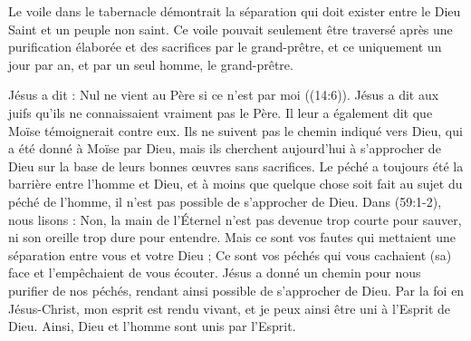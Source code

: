 Le voile dans le tabernacle démontrait la séparation qui doit exister entre le Dieu Saint et un peuple non saint. Ce voile pouvait seulement être traversé après une purification élaborée et des sacrifices par le grand-prêtre, et ce uniquement un jour par an, et par un seul homme, le grand-prêtre.

Jésus a dit : \og Nul ne vient au Père si ce n'est par moi \fg{} ((14:6)). Jésus a dit aux juifs qu'ils ne connaissaient vraiment pas le Père. Il leur a également dit que Moïse témoignerait contre eux. Ils ne suivent pas le chemin indiqué vers Dieu, qui a été donné à Moïse par Dieu, mais ils cherchent aujourd'hui à s'approcher de Dieu sur la base de leurs bonnes œuvres sans sacrifices. Le péché a toujours été la barrière entre l'homme et Dieu, et à moins que quelque chose soit fait au sujet du péché de l'homme, il n'est pas possible de s'approcher de Dieu. Dans (59:1-2), nous lisons : \og Non, la main de l'Éternel n'est pas devenue trop courte pour sauver, ni son oreille trop dure pour entendre. Mais ce sont vos fautes qui mettaient une séparation entre vous et votre Dieu ; Ce sont vos péchés qui vous cachaient (sa) face et l'empêchaient de vous écouter. \fg{} Jésus a donné un chemin pour nous purifier de nos péchés, rendant ainsi possible de s'approcher de Dieu. Par la foi en Jésus-Christ, mon esprit est rendu vivant, et je peux ainsi être uni à l'Esprit de Dieu. Ainsi, Dieu et l'homme sont unis par l'Esprit.

